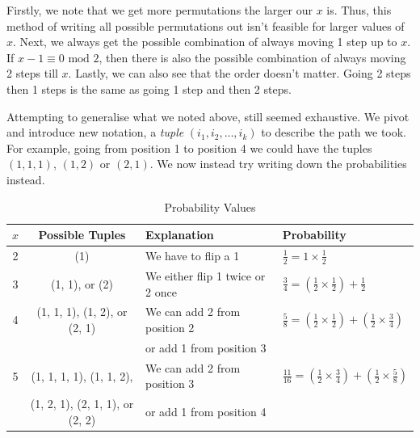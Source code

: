 \documentclass[11pt]{article}
\newcommand{\keywordfont}{\textsc}
\newcommand{\keyword}[1]{%
  \marginpar{\raggedright\small\keywordfont{#1}}}
\begin{document}
Firstly, we note \keyword{AHA} that we get more permutations the larger our $x$ is. Thus, this method of writing all possible permutations out isn't feasible  for larger values of $x$. Next, we always get the possible combination of always moving 1 step up to $x$. If $x-1 \equiv 0 \text{ mod } 2$, then there is also the possible combination of always moving 2 steps till $x$. Lastly, we can also see that the order doesn't matter. Going 2 steps then 1 steps is the same as going 1 step and then 2 steps.

Attempting to \keyword{Stuck} generalise what we noted above, still seemed exhaustive. We pivot and introduce new notation, a \textit{tuple} $(i_1, i_2, \dots, i_k)$\keyword{Introduce} to describe the path we took. For example, going from position 1 to position 4 we could have the tuples $(1, 1, 1)$, $(1, 2)$ or $(2, 1)$. 
We now instead try \keyword{Try} writing down the probabilities instead.

\begin{table}[h]
    \centering
    \renewcommand{\arraystretch}{1.2}
    \begin{tabular}{|c|c|l|l|} \hline 
         $x$&  Possible Tuples &Explanation &Probability \\ \hline
         2&   (1)&We have to flip a 1 &$\frac{1}{2} = 1 \times \frac{1}{2}$\\ \hline
 3&  (1, 1), or (2)&We either flip 1 twice or 2 once&$\frac{3}{4} = (\frac{1}{2} \times \frac{1}{2}) + \frac{1}{2}$\\ \hline
         4&   (1, 1, 1), (1, 2), or (2, 1)& We can add 2 from position 2 &$\frac{5}{8} = (\frac{1}{2} \times \frac{1}{2}) + (\frac{1}{2} \times \frac{3}{4})$\\
 & & or add 1 from position 3& \\ \hline
 5& (1, 1, 1, 1), (1, 1, 2), & We can add 2 from position 3 & $\frac{11}{16}= (\frac{1}{2} \times \frac{3}{4}) + (\frac{1}{2} \times \frac{5}{8})$\\
 & (1, 2, 1), (2, 1, 1), or (2, 2)& or add 1 from position 4& \\ \hline 
    \end{tabular}
    \caption{Probability Values}
    \label{tab:my_label}
\end{table}
\end{document}
